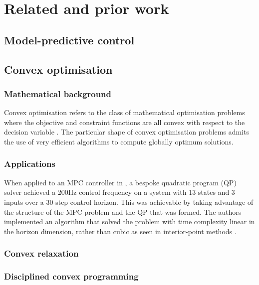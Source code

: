\chapter{Related and prior work}

\section{Model-predictive control}

\section{Convex optimisation}

\subsection{Mathematical background}

Convex optimisation refers to the class of mathematical optimisation problems
where the objective and constraint functions are all convex with respect to the
decision variable \cite{Boyd04}. The particular shape of convex optimisation
problems admits the use of very efficient algorithms to compute globally
optimum solutions.

\subsection{Applications}

When applied to an MPC controller in \cite{Wang10}, a bespoke quadratic program
(QP) solver achieved a 200Hz control frequency on a system with 13 states and 3
inputs over a 30-step control horizon. This was achievable by taking advantage
of the structure of the MPC problem and the QP that was formed. The authors
implemented an algorithm that solved the problem with time complexity linear in
the horizon dimension, rather than cubic as seen in interior-point methods
\cite{}.

\subsection{Convex relaxation}

\subsection{Disciplined convex programming}

